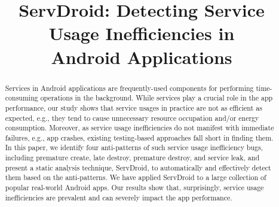 \documentclass[sigconf,review, anonymous]{acmart}
\begin{document}
\title{ServDroid: Detecting Service Usage Inefficiencies in\\  Android Applications}

\begin{abstract}
Services in Android applications are frequently-used components for performing
time-consuming operations in the background. While services play a crucial role
in the app performance, our study shows that service usages in practice are not
as efficient as expected, e.g., they tend to cause unnecessary resource occupation
and/or energy consumption.
Moreover, as service usage inefficiencies do not manifest
with immediate failures, e.g., app crashes, existing testing-based approaches
fall short in finding them.
In this paper, we identify four anti-patterns of such service usage
inefficiency bugs, including premature create, late destroy, premature destroy,
and service leak, and present a static analysis technique, \textsf{ServDroid},
to automatically and effectively detect them based on the anti-patterns.
We have applied \textsf{ServDroid} to a large collection of popular real-world
Android apps. Our results show that, surprisingly, service usage inefficiencies
are prevalent and can severely impact the app performance.
\end{abstract}
\end{document}
